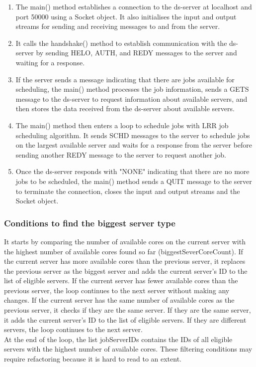 \documentclass[a4paper]{article} %
\begin{document}
\begin{enumerate}
    \item The main() method establishes a connection to the ds-server at localhost and port 50000 using a Socket object. It also initialises the input and output streams for sending and receiving messages to and from the server.

    \item It calls the handshake() method to establish communication with the ds-server by sending HELO, AUTH, and REDY messages to the server and waiting for a response.

    \item If the server sends a message indicating that there are jobs available for scheduling, the main() method processes the job information, sends a GETS message to the ds-server to request information about available servers, and then stores the data received from the ds-server about available servers.

    \item The main() method then enters a loop to schedule jobs with LRR job scheduling algorithm. It sends SCHD messages to the server to schedule jobs on the largest available server and waits for a response from the server before sending another REDY message to the server to request another job.

    \item Once the ds-server responds with "NONE" indicating that there are no more jobs to be scheduled, the main() method sends a QUIT message to the server to terminate the connection, closes the input and output streams and the Socket object.
\end{enumerate}
\subsubsection{Conditions to find the biggest server type}
It starts by comparing the number of available cores on the current server with the highest number of available cores found so far (biggestSeverCoreCount). If the current server has more available cores than the previous server, it replaces the previous server as the biggest server and adds the current server's ID to the list of eligible servers. If the current server has fewer available cores than the previous server, the loop continues to the next server without making any changes. If the current server has the same number of available cores as the previous server, it checks if they are the same server. If they are the same server, it adds the current server's ID to the list of eligible servers. If they are different servers, the loop continues to the next server. 
\\At the end of the loop, the list jobServerIDs contains the IDs of all eligible servers with the highest number of available cores. These filtering conditions may require refactoring because it is hard to read to an extent.
\end{document}
